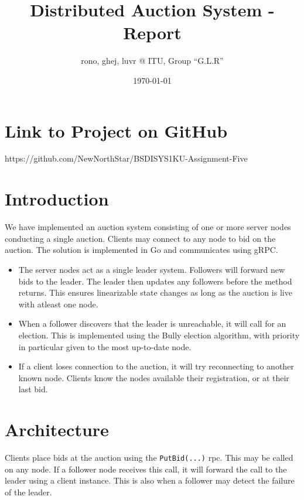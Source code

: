 \documentclass[a4paper,11pt]{article}
\title{Distributed Auction System - Report}
\author{rono, ghej, luvr @ ITU, Group ``G.L.R''}
\date{\today}
\begin{document}
\maketitle

\tableofcontents

\pagebreak

\section{Link to Project on GitHub}
https://github.com/NewNorthStar/BSDISYS1KU-Assignment-Five

\section{Introduction}

We have implemented an auction system consisting of one or more server nodes conducting a single auction. Clients may connect to any node to bid on the auction. The solution is implemented in Go and communicates using gRPC.

\begin{itemize}
    \item The server nodes act as a single leader system. Followers will forward new bids to the leader. The leader then updates any followers before the method returns. This ensures linearizable state changes as long as the auction is live with atleast one node. 
    \item When a follower discovers that the leader is unreachable, it will call for an election. This is implemented using the Bully election algorithm, with priority in particular given to the most up-to-date node.
    \item If a client loses connection to the auction, it will try reconnecting to another known node. Clients know the nodes available their registration, or at their last bid. 
\end{itemize}

\section{Architecture}

Clients place bids at the auction using the \texttt{PutBid(...)} rpc. This may be called on any node. If a follower node receives this call, it will forward the call to the leader using a client instance. This is also when a follower may detect the failure of the leader. 

\bigbreak
\end{document}
